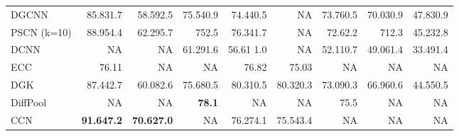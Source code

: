\documentclass{article}
\begin{document}
\begin{table}[t]
{\begin{tabular}{@{\hskip8pt}l@{\hskip8pt}r@{\hskip8pt}r@{\hskip8pt}r@{\hskip8pt}r@{\hskip8pt}r@{\hskip8pt}r@{\hskip8pt}r@{\hskip8pt}r@{\hskip8pt}}
		\midrule
			DGCNN \citep{Zhang} & 85.831.7 & 58.592.5 &  75.540.9 & 74.440.5 & NA    & 73.760.5 & 70.030.9 & 47.830.9 \\
		PSCN \citep{Niepert2016}{\tiny (k=10)} & 88.954.4 & 62.295.7 & 752.5 & 76.341.7 & NA    & 72.62.2 & 712.3 & 45.232.8 \\
		DCNN \citep{Atwood2015}  & NA    & NA    &  61.291.6 & 56.61 1.0 & NA    & 52.110.7 & 49.061.4 & 33.491.4 \\
		ECC \citep{Simonovsky2017}  & 76.11 & NA    &  NA    & 76.82 & 75.03 & NA    & NA    & NA \\
		DGK \citep{Yanardag2015}  & 87.442.7 & 60.082.6 &  75.680.5 & 80.310.5 & 80.320.3 & 73.090.3 & 66.960.6 & 44.550.5 \\
		DiffPool \citep{Ying2018} & NA    & NA    &  \bf{78.1}  & NA    & NA    & 75.5  & NA    & NA \\
		CCN \citep{Kondor2018}  & \bf{91.647.2} & \bf{70.627.0} &  NA    & 76.274.1 & 75.543.4 & NA    & NA    & NA \\
		

\end{tabular}}
\end{table}
\end{document}
